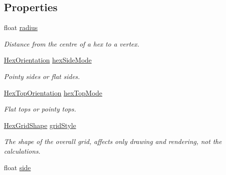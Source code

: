 \subsection*{Properties}
\begin{DoxyCompactItemize}
\item 
float \hyperlink{class_g_f_hex_grid_a99701e2998e2b7305bb1bbe0c1ef9506_a99701e2998e2b7305bb1bbe0c1ef9506}{radius}
\begin{DoxyCompactList}\small\item\em Distance from the centre of a hex to a vertex.\end{DoxyCompactList}\item 
\hyperlink{class_g_f_hex_grid_af3503ff5abb4dc3569875daa37dfd6e6_af3503ff5abb4dc3569875daa37dfd6e6}{Hex\+Orientation} \hyperlink{class_g_f_hex_grid_a1c7aee0c19fe71879a1056d1c04be420_a1c7aee0c19fe71879a1056d1c04be420}{hex\+Side\+Mode}
\begin{DoxyCompactList}\small\item\em Pointy sides or flat sides.\end{DoxyCompactList}\item 
\hyperlink{class_g_f_hex_grid_aa82586fdc2de52a215609e48abcc265a_aa82586fdc2de52a215609e48abcc265a}{Hex\+Top\+Orientation} \hyperlink{class_g_f_hex_grid_a651e7fbf9e12e4d8fd31f21503aeb120_a651e7fbf9e12e4d8fd31f21503aeb120}{hex\+Top\+Mode}
\begin{DoxyCompactList}\small\item\em Flat tops or pointy tops.\end{DoxyCompactList}\item 
\hyperlink{class_g_f_hex_grid_a6394c0f75370f3b02e437f28e52127d7_a6394c0f75370f3b02e437f28e52127d7}{Hex\+Grid\+Shape} \hyperlink{class_g_f_hex_grid_aa655390c4d3e1872978c50b964107dff_aa655390c4d3e1872978c50b964107dff}{grid\+Style}
\begin{DoxyCompactList}\small\item\em The shape of the overall grid, affects only drawing and rendering, not the calculations.\end{DoxyCompactList}\item 
float \hyperlink{class_g_f_hex_grid_a09ba217a58d06021fe82fed119c96969_a09ba217a58d06021fe82fed119c96969}{side}

\end{DoxyCompactItemize}
